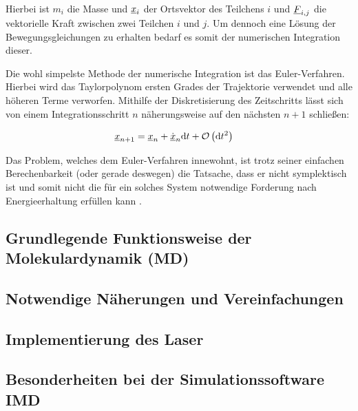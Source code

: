 		Hierbei ist $m_i$ die Masse und $\underline{x}_i$ der Ortsvektor des Teilchens $i$ und
		$\underline{F}_{i,j}$ die vektorielle Kraft zwischen zwei Teilchen $i$ und $j$. Um dennoch eine
		Lösung der Bewegungsgleichungen zu erhalten bedarf es somit der numerischen Integration
		dieser.

		Die wohl simpelste Methode der numerische Integration ist das Euler-Verfahren. Hierbei
		wird das Taylorpolynom ersten Grades der Trajektorie verwendet und alle höheren Terme
		verworfen. Mithilfe der Diskretisierung des Zeitschritts \dt lässt sich von einem
		Integrationsschritt $n$ näherungsweise auf den nächsten $n+1$ schließen:

		\begin{align}
			\underline{x}_{n+1} &= \underline{x}_n + \dot{\underline{x}}_n \text{d} t + \operatorname{\mathcal{O}}\left(\text{d} t^2\right)
		\end{align}

		Das Problem, welches dem Euler-Verfahren innewohnt, ist trotz seiner einfachen
		Berechenbarkeit (oder gerade deswegen) die Tatsache, dass er nicht symplektisch ist und
		somit nicht die für ein solches System notwendige Forderung nach Energieerhaltung
		erfüllen kann \cite[S. 6f]{klein2013klassische}.


	\subsection{Grundlegende Funktionsweise der Molekulardynamik (MD)}

	\subsection{Notwendige Näherungen und Vereinfachungen}
	\subsection{Implementierung des Laser}
	\subsection{Besonderheiten bei der Simulationssoftware IMD}
